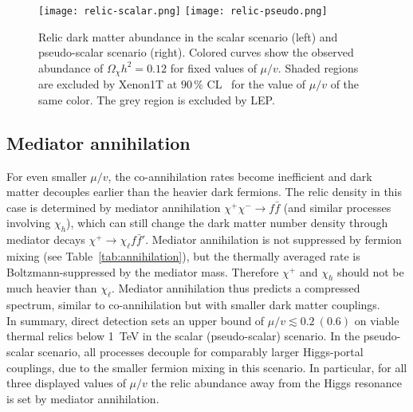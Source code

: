 \documentclass[nofootinbib,prd,aps,superscriptaddress,preprintnumbers]{revtex4}
\begin{document}
\begin{figure}[!t]
\centering
\texttt{[image: relic-scalar.png]} \hspace*{0.2cm} \texttt{[image: relic-pseudo.png]}
\caption{\label{fig:relic-abundance}Relic dark matter abundance in the scalar scenario (left) and pseudo-scalar scenario (right). Colored curves show the observed abundance of $\Omega_\chi h^2 = 0.12$ for fixed values of $\mu/v$. Shaded regions are excluded by Xenon1T at $90\,\%$ CL~\cite{Aprile:2018dbl} for the value of $\mu/v$ of the same color. The grey region is excluded by LEP.}
\end{figure}
\subsection{Mediator annihilation}\noindent For even smaller $\mu/v$, the co-annihilation rates become inefficient and dark matter decouples earlier than the heavier dark fermions. The relic density in this case is determined by mediator annihilation $\chi^+\chi^-\to f\bar{f}$ (and similar processes involving $\chi_h$), which can still change the dark matter number density through mediator decays $\chi^+ \to \chi_\ell f \bar{f}'$. Mediator annihilation is not suppressed by fermion mixing (see Table~\ref{tab:annihilation}), but the thermally averaged rate is Boltzmann-suppressed by the mediator mass. Therefore $\chi^+$ and $\chi_h$ should not be much heavier than $\chi_\ell$. Mediator annihilation thus predicts a compressed spectrum, similar to co-annihilation but with smaller dark matter couplings.\\

In summary, direct detection sets an upper bound of $\mu/v \lesssim 0.2\ (0.6)$ on viable thermal relics below 1~TeV in the scalar (pseudo-scalar) scenario. In the pseudo-scalar scenario, all processes decouple for comparably larger Higgs-portal couplings, due to the smaller fermion mixing in this scenario. In particular, for all three displayed values of $\mu/v$ the relic abundance away from the Higgs resonance is set by mediator annihilation.
\end{document}

